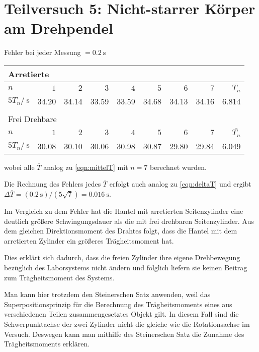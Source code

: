 \newpage
\section{Teilversuch 5: Nicht-starrer Körper am Drehpendel}
	Fehler bei jeder Messung $= \SI{0,2}{\second}$

	\begin{center}
		\begin{tabular}{l *{7}{r} | r}
			\multicolumn{8}{l}{Arretierte} \\
			\toprule
			$n$ & $1$ & $2$ & $3$ & $4$ & $5$ & $6$ & $7$ & $\overbar{T_n}$ \\
			\midrule
			$5T_n/\SI{}{\second}$ & \SI{34.20}{} & \SI{34.14}{} & \SI{33.59}{} & \SI{33.59}{} & \SI{34.68}{} & \SI{34.13}{} & \SI{34.16}{} & \SI{6.814}{} \\
			\bottomrule \\
			\multicolumn{8}{l}{Frei Drehbare} \\
			\toprule
			$n$ & $1$ & $2$ & $3$ & $4$ & $5$ & $6$ & $7$ & $\overbar{T_n}$ \\
			\midrule
			$5T_n/\SI{}{\second}$ & \SI{30.08}{} & \SI{30.10}{} & \SI{30.06}{} & \SI{30.98}{} & \SI{30.87}{} & \SI{29.80}{} & \SI{29.84}{} & \SI{6.049}{} \\
			\bottomrule 
		\end{tabular}
	\end{center}
	wobei alle $\overbar{T}$ analog zu \eqref{eqn:mittelT} mit $n = 7$ berechnet wurden.

	Die Rechnung des Fehlers jedes $\overbar{T}$ erfolgt auch analog zu \eqref{eqn:deltaT} und ergibt $\Delta \overbar{T} = (\SI{0.2}{\second})/(5\sqrt{7}) = \SI{0.016}{\second}$.

	Im Vergleich zu dem Fehler hat die Hantel mit arretierten Seitenzylinder eine deutlich größere Schwingungsdauer als die mit frei drehbaren Seitenzylinder. Aus dem gleichen Direktionsmoment des Drahtes folgt, dass die Hantel mit dem arretierten Zylinder ein größeres Trägheitsmoment hat.

	Dies erklärt sich dadurch, dass die freien Zylinder ihre eigene Drehbewegung bezüglich des Laborsystems nicht ändern und folglich liefern sie keinen Beitrag zum Trägheitsmoment des Systems. 

	Man kann hier trotzdem den Steinerschen Satz anwenden, weil das Superpositionsprinzip für die Berechnung des Trägheitsmoments eines aus verschiedenen Teilen zusammengesetztes Objekt gilt. In diesem Fall sind die Schwerpunktachse der zwei Zylinder nicht die gleiche wie die Rotationsachse im Versuch. Deswegen kann man mithilfe des Steinerschen Satz die Zunahme des Trägheitsmoments erklären. 